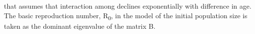 that assumes that interaction among declines exponentially with
difference in age. The basic reproduction number, R\textsubscript{0}, in
the model of the initial population size is taken as the dominant
eigenvalue of the matrix B.